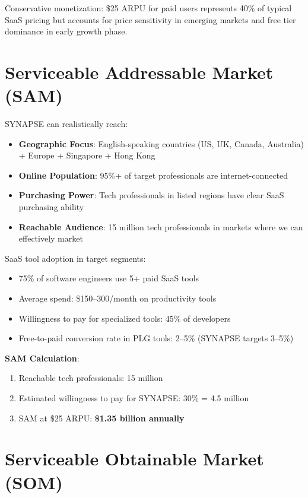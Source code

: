 \documentclass{report}
\begin{document}
Conservative monetization: \$25 ARPU for paid users represents 40\% of typical SaaS pricing but accounts for price sensitivity in emerging markets and free tier dominance in early growth phase.

\section{Serviceable Addressable Market (SAM)}

SYNAPSE can realistically reach:

\begin{itemize}
    \item \textbf{Geographic Focus}: English-speaking countries (US, UK, Canada, Australia) + Europe + Singapore + Hong Kong
    \item \textbf{Online Population}: 95\%+ of target professionals are internet-connected
    \item \textbf{Purchasing Power}: Tech professionals in listed regions have clear SaaS purchasing ability
    \item \textbf{Reachable Audience}: 15 million tech professionals in markets where we can effectively market
\end{itemize}

SaaS tool adoption in target segments:

\begin{itemize}
    \item 75\% of software engineers use 5+ paid SaaS tools
    \item Average spend: \$150--300/month on productivity tools
    \item Willingness to pay for specialized tools: 45\% of developers
    \item Free-to-paid conversion rate in PLG tools: 2--5\% (SYNAPSE targets 3--5\%)
\end{itemize}

\textbf{SAM Calculation}:
\begin{enumerate}
    \item Reachable tech professionals: 15 million
    \item Estimated willingness to pay for SYNAPSE: 30\% = 4.5 million
    \item SAM at \$25 ARPU: \textbf{\$1.35 billion annually}
\end{enumerate}

\section{Serviceable Obtainable Market (SOM)}
\end{document}
